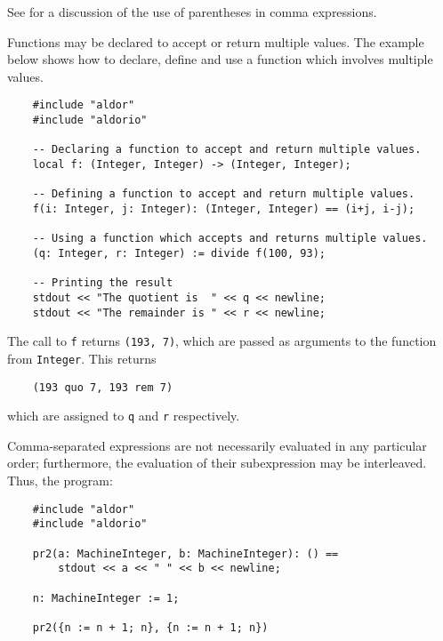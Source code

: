 See  for a discussion of the use
of parentheses in comma expressions.

Functions may be declared to accept or return multiple values.
The example below shows how to declare, define and use a function which
involves multiple values.

\begin{small}
\begin{verbatim}
    #include "aldor"
    #include "aldorio"

    -- Declaring a function to accept and return multiple values.
    local f: (Integer, Integer) -> (Integer, Integer);

    -- Defining a function to accept and return multiple values.
    f(i: Integer, j: Integer): (Integer, Integer) == (i+j, i-j);

    -- Using a function which accepts and returns multiple values.
    (q: Integer, r: Integer) := divide f(100, 93);

    -- Printing the result
    stdout << "The quotient is  " << q << newline;
    stdout << "The remainder is " << r << newline;
\end{verbatim}
\end{small}

The call to \verb"f" returns \verb"(193, 7)",
which are passed as arguments to the function 
from \verb"Integer".  This returns

\begin{small}
\begin{verbatim}
    (193 quo 7, 193 rem 7)
\end{verbatim}
\end{small}

which are assigned to \verb"q" and \verb"r" respectively.

Comma-separated expressions are not necessarily evaluated
in any particular order; furthermore, the evaluation of their
subexpression may be interleaved.  Thus, the program:

\begin{small}
\begin{verbatim}
    #include "aldor"
    #include "aldorio"

    pr2(a: MachineInteger, b: MachineInteger): () ==
        stdout << a << " " << b << newline;

    n: MachineInteger := 1;

    pr2({n := n + 1; n}, {n := n + 1; n})
\end{verbatim}
\end{small}


